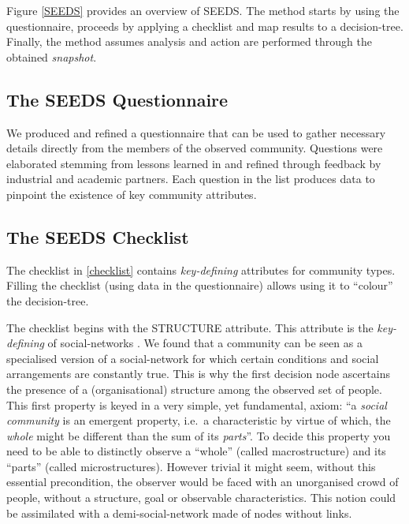 Figure \ref{SEEDS} provides an overview of SEEDS. The method starts by using the questionnaire, proceeds by applying a checklist and map results to a decision-tree. Finally, the method assumes analysis and action are performed through the obtained \emph{snapshot}.

\subsection{The SEEDS Questionnaire}\label{quest}

We produced and refined a questionnaire that can be used to gather necessary details directly from the members of the observed community. Questions were elaborated stemming from lessons learned in \cite{specissue} and refined through feedback by industrial and academic partners. Each question in the list produces data to pinpoint the existence of key community attributes.

\subsection{The SEEDS Checklist}\label{cl}

The checklist in \ref{checklist} contains \emph{key-defining} attributes for community types. Filling the checklist (using data in the questionnaire) allows using it to ``colour'' the decision-tree.

The checklist begins with the STRUCTURE attribute. This attribute is the \emph{key-defining} of social-networks \cite{ossslr}. We found that a community can be seen as a specialised version of a social-network for which certain conditions and social arrangements are constantly true. This is why the first decision node ascertains the presence of a (organisational) structure among the observed set of people. This first property is keyed in a very simple, yet fundamental, axiom: ``a \emph{social community} is an emergent property, i.e.~a characteristic by virtue of which, the \emph{whole} might be different than the sum of its \emph{parts}''. To decide this property you need to be able to distinctly observe a ``whole'' (called macrostructure) and its ``parts'' (called microstructures). However trivial it might seem, without this essential precondition, the observer would be faced with an unorganised crowd of people, without a structure, goal or observable characteristics. This notion could be assimilated with a demi-social-network made of nodes without links.

